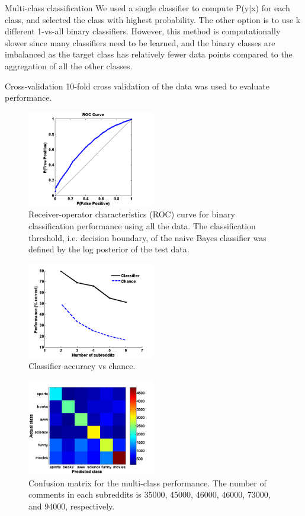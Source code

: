 \documentclass[10pt,twocolumn]{article}
\begin{document}
Multi-class classification
We used a single classifier to compute P(y|x) for each class, and selected the class with highest probability.
The other option is to use k different 1-vs-all binary classifiers. However, this method is computationally slower since many classifiers need to be learned, and the binary classes are imbalanced as the target class has relatively fewer data points compared to the aggregation of all the other classes.

Cross-validation
10-fold cross validation of the data was used to evaluate performance.

\begin{figure}
    \centering
  	\includegraphics[width=0.5\textwidth]{./roc.png}
  	\caption{Receiver-operator characteristics (ROC) curve for binary classification performance using all the data. The classification threshold, i.e. decision boundary, of the naive Bayes classifier was defined by the log posterior of the test data.}
  	\label{roc}
\end{figure}		

\begin{figure}
    \centering
  	\includegraphics[width=0.5\textwidth]{./varyWBaseline.png}
  	\caption{Classifier accuracy vs chance.}
  	\label{}
\end{figure}	

\begin{figure}
    \centering
  	\includegraphics[width=0.5\textwidth]{./confusion_mat.png}
  	\caption{Confusion matrix for the multi-class performance. The number of comments in each subreddits is 35000, 45000, 46000, 46000, 73000, and 94000, respectively.}
  	\label{confusion}
\end{figure}	
\end{document}
